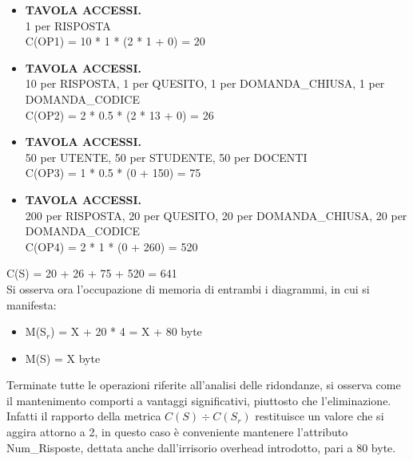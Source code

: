 \documentclass{article}
\begin{document}
\begin{itemize}[label={ }]
    \itemsep0em 
    \item {\small\textbf{TAVOLA ACCESSI.} \\ 1 per RISPOSTA} \vspace*{2pt}\\ C(OP1) = 10 * 1 * (2 * 1 + 0) = 20 \vspace*{2pt} 
    \item {\small\textbf{TAVOLA ACCESSI.} \\ 10 per RISPOSTA, 1 per QUESITO, 1 per DOMANDA\_CHIUSA, 1 per DOMANDA\_CODICE} \vspace*{2pt}\\ C(OP2) = 2 * 0.5 * (2 * 13 + 0) = 26 \vspace*{2pt}
    \item {\small\textbf{TAVOLA ACCESSI.} \\ 50 per UTENTE, 50 per STUDENTE, 50 per DOCENTI} \vspace*{2pt}\\ C(OP3) = 1 * 0.5 * (0 + 150) = 75
    \item {\small\textbf{TAVOLA ACCESSI.} \\ 200 per RISPOSTA, 20 per QUESITO, 20 per DOMANDA\_CHIUSA, 20 per DOMANDA\_CODICE} \vspace*{2pt}\\ C(OP4) = 2 * 1 * (0 + 260) = 520
\end{itemize}
\hspace*{15pt}C(S) = 20 + 26 + 75 + 520 = 641 \vspace*{7pt} \vspace*{7pt}\\
Si osserva ora l'occupazione di memoria di entrambi i diagrammi, in cui si manifesta:
\begin{itemize}[label={ }]
    \itemsep0em
    \item M(S$_r$) = X + 20 * 4 = X + 80 byte
    \item M(S) = \hspace*{1pt}X byte
\end{itemize}
Terminate tutte le operazioni riferite all'analisi delle ridondanze, si osserva come il mantenimento comporti a vantaggi significativi, piuttosto che l'eliminazione. Infatti il rapporto della metrica $C(S) \div C(S_r)$ restituisce un valore che si aggira attorno a 2, in questo caso è conveniente mantenere l'attributo Num\_Risposte, dettata anche dall'irrisorio overhead introdotto, pari a 80 byte.

\newpage
\end{document}
